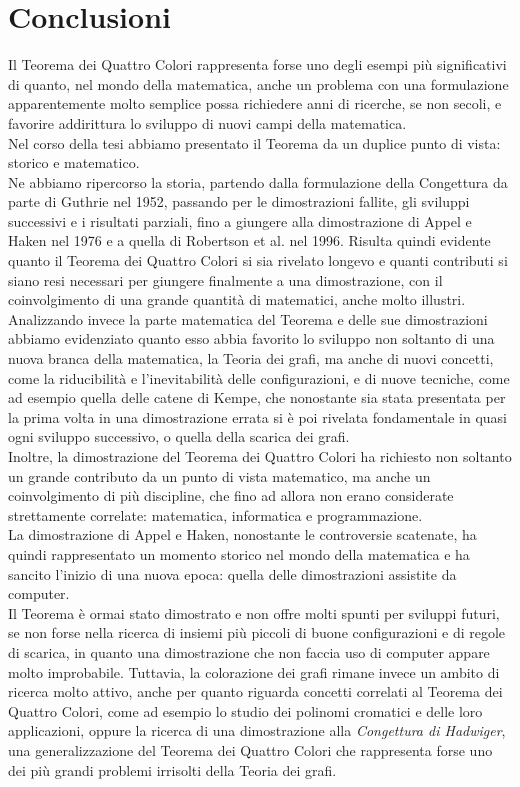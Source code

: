 \documentclass[a4paper,12pt,titlepage]{report}
\begin{document}
    \chapter{Conclusioni}
    Il Teorema dei Quattro Colori rappresenta forse uno degli esempi più significativi di quanto, nel mondo della matematica, anche un problema con una formulazione apparentemente molto semplice possa richiedere anni di ricerche, se non secoli, e favorire addirittura lo sviluppo di nuovi campi della matematica.
    \\Nel corso della tesi abbiamo presentato il Teorema da un duplice punto di vista: storico e matematico.
    \\Ne abbiamo ripercorso la storia, partendo dalla formulazione della Congettura da parte di Guthrie nel 1952, passando per le dimostrazioni fallite, gli sviluppi successivi e i risultati parziali, fino a giungere alla dimostrazione di Appel e Haken nel 1976 e a quella di Robertson et al. nel 1996. Risulta quindi evidente quanto il Teorema dei Quattro Colori si sia rivelato longevo e quanti contributi si siano resi necessari per giungere finalmente a una dimostrazione, con il coinvolgimento di una grande quantità di matematici, anche molto illustri.
    \\Analizzando invece la parte matematica del Teorema e delle sue dimostrazioni abbiamo evidenziato quanto esso abbia favorito lo sviluppo non soltanto di una nuova branca della matematica, la Teoria dei grafi, ma anche di nuovi concetti, come la riducibilità e l'inevitabilità delle configurazioni, e di nuove tecniche, come ad esempio quella delle catene di Kempe, che nonostante sia stata presentata per la prima volta in una dimostrazione errata si è poi rivelata fondamentale in quasi ogni sviluppo successivo, o quella della scarica dei grafi.
    \\Inoltre, la dimostrazione del Teorema dei Quattro Colori ha richiesto non soltanto un grande contributo da un punto di vista matematico, ma anche un coinvolgimento di più discipline, che fino ad allora non erano considerate strettamente correlate: matematica, informatica e programmazione.
    \\La dimostrazione di Appel e Haken, nonostante le controversie scatenate, ha quindi rappresentato un momento storico nel mondo della matematica e ha sancito l'inizio di una nuova epoca: quella delle dimostrazioni assistite da computer.
    \\Il Teorema è ormai stato dimostrato e non offre molti spunti per sviluppi futuri, se non forse nella ricerca di insiemi più piccoli di buone configurazioni e di regole di scarica, in quanto una dimostrazione che non faccia uso di computer appare molto improbabile. Tuttavia, la colorazione dei grafi rimane invece un ambito di ricerca molto attivo, anche per quanto riguarda concetti correlati al Teorema dei Quattro Colori, come ad esempio lo studio dei polinomi cromatici e delle loro applicazioni, oppure la ricerca di una dimostrazione alla \emph{Congettura di Hadwiger}, una generalizzazione del Teorema dei Quattro Colori che rappresenta forse uno dei più grandi problemi irrisolti della Teoria dei grafi.
\end{document}
